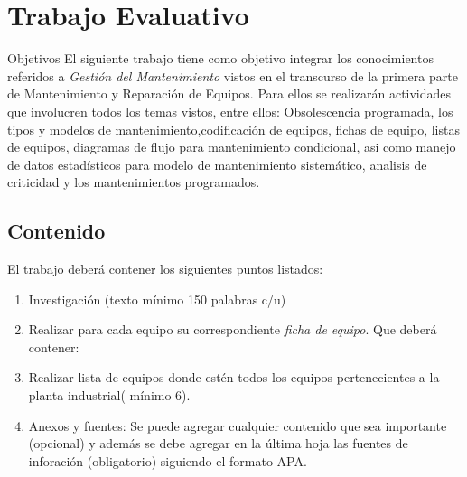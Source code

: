 \section{Trabajo Evaluativo}


\begin{tcolorbox}[]
Objetivos
\tcblower
El siguiente trabajo tiene como objetivo integrar los conocimientos referidos a \emph{Gestión del Mantenimiento} vistos en el transcurso de la primera parte de Mantenimiento y Reparación de Equipos. Para ellos se realizarán actividades que involucren todos los temas vistos, entre ellos: Obsolescencia programada, los tipos y modelos de mantenimiento,codificación de equipos, fichas de equipo, listas de equipos, diagramas de flujo para mantenimiento condicional, asi como manejo de datos estadísticos para modelo de mantenimiento sistemático, analisis de criticidad y los mantenimientos programados.
\end{tcolorbox}

\subsection{Contenido}
El trabajo deberá contener los siguientes puntos listados:
\begin{enumerate}
    \item Investigación (texto mínimo 150 palabras c/u)
    \item Realizar para cada equipo su correspondiente \emph{ficha de equipo}. Que deberá contener:
    \item Realizar lista de equipos donde estén todos los equipos pertenecientes a la planta industrial( mínimo 6).
    \item Anexos y fuentes: Se puede agregar cualquier contenido que sea importante (opcional) y además se debe agregar en la última hoja las fuentes de inforación (obligatorio) siguiendo el formato APA.
\end{enumerate}


\newpage